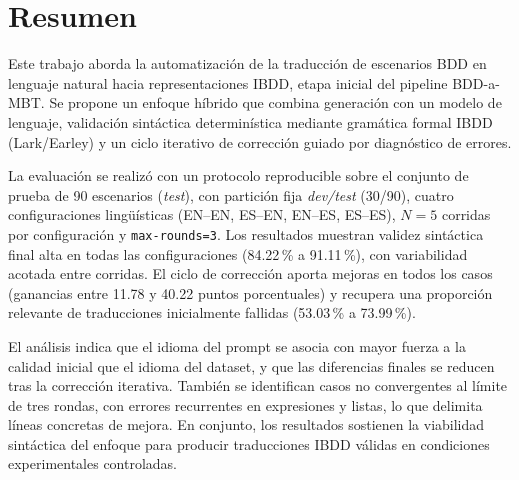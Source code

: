 \chapter*{Resumen}

Este trabajo aborda la automatización de la traducción de escenarios BDD en lenguaje natural hacia representaciones IBDD, etapa inicial del pipeline BDD-a-MBT. Se propone un enfoque híbrido que combina generación con un modelo de lenguaje, validación sintáctica determinística mediante gramática formal IBDD (Lark/Earley) y un ciclo iterativo de corrección guiado por diagnóstico de errores.

La evaluación se realizó con un protocolo reproducible sobre el conjunto de prueba de 90 escenarios (\textit{test}), con partición fija \textit{dev/test} (30/90), cuatro configuraciones lingüísticas (EN--EN, ES--EN, EN--ES, ES--ES), $N=5$ corridas por configuración y \texttt{max-rounds=3}. Los resultados muestran validez sintáctica final alta en todas las configuraciones (84.22\,\% a 91.11\,\%), con variabilidad acotada entre corridas. El ciclo de corrección aporta mejoras en todos los casos (ganancias entre 11.78 y 40.22 puntos porcentuales) y recupera una proporción relevante de traducciones inicialmente fallidas (53.03\,\% a 73.99\,\%).

El análisis indica que el idioma del prompt se asocia con mayor fuerza a la calidad inicial que el idioma del dataset, y que las diferencias finales se reducen tras la corrección iterativa. También se identifican casos no convergentes al límite de tres rondas, con errores recurrentes en expresiones y listas, lo que delimita líneas concretas de mejora. En conjunto, los resultados sostienen la viabilidad sintáctica del enfoque para producir traducciones IBDD válidas en condiciones experimentales controladas.
